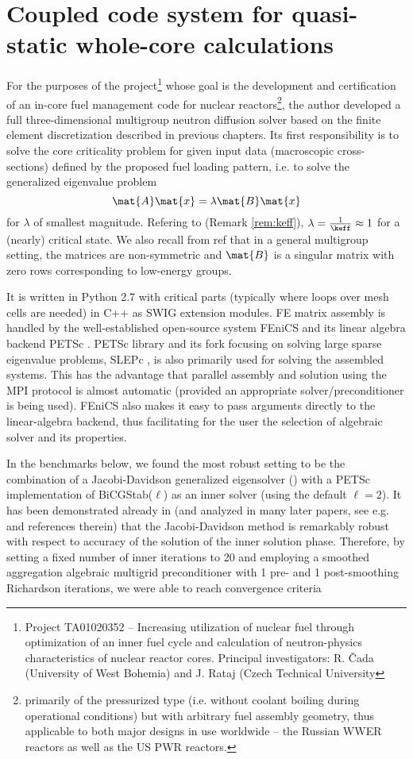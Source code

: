 \chapter{Coupled code system for quasi-static whole-core calculations}\label{chap:coupled}

For the purposes of the project\footnote{
Project TA01020352 -- Increasing utilization of nuclear fuel through optimization of an inner fuel cycle and
calculation of neutron-physics characteristics of nuclear reactor cores. Principal investigators: R. {\v C}ada
(University of West Bohemia) and J. Rataj (Czech Technical University} 
whose goal is the development and certification of an in-core fuel management code for nuclear
reactors\footnote{ primarily of the pressurized type (i.e. without coolant boiling during operational conditions) but with arbitrary fuel
assembly geometry, thus applicable to both major designs in use worldwide -- the Russian WWER reactors as well as the
US PWR reactors.}, the author developed a full three-dimensional multigroup neutron diffusion solver based on the finite
element discretization described in previous chapters. Its first responsibility is to solve the core criticality problem
for given input data (macroscopic cross-sections) defined by the proposed fuel loading pattern, i.e. to solve the
generalized eigenvalue problem
$$
	\mat{A}\mat{x} = \lambda\mat{B}\mat{x}
$$
for $\lambda$ of smallest magnitude. Refering to  (Remark \ref{rem:keff}), $\lambda =
\frac{1}{\keff} \approx 1$ for a (nearly) critical state. We also recall from \alert{ref} that in a general multigroup
setting, the matrices are non-symmetric and $\mat{B}$ is a singular matrix with zero rows corresponding to low-energy
groups.

It is written in Python 2.7 with critical parts (typically where loops over mesh cells are needed) in C++ as SWIG
extension modules. FE matrix assembly is handled by the well-established open-source system FEniCS \cite{dolfin1,
dolfin2} and its linear algebra backend PETSc \cite{petsc1}. PETSc library and its fork focusing on solving large sparse
eigenvalue problems, SLEPc \cite{slepc1}, is also primarily used for solving the assembled systems. This has the
advantage that parallel assembly and solution using the MPI protocol is almost automatic (provided an appropriate
solver/preconditioner is being used).
FEniCS also makes it easy to pass arguments directly to the linear-algebra backend, thus facilitating for the user the
selection of algebraic solver and its properties. 

In the benchmarks below, we found the most robust setting to be the combination of a Jacobi-Davidson generalized
eigensolver (\cite{slepcjd}) with a PETSc implementation of BiCGStab($\ell$) \cite{Sleijpen1} as an inner solver (using
the default $\ell = 2$). It has been demonstrated already in \cite{Sleijpen1} (and analyzed in many later papers, see
e.g.  and references therein) that the Jacobi-Davidson method is remarkably robust with respect to accuracy
of the solution of the inner solution phase. Therefore, by setting a fixed number of inner iterations to 20 and
employing a smoothed aggregation algebraic multigrid preconditioner with 1 pre- and 1 post-smoothing Richardson
iterations, we were able to reach convergence criteria

